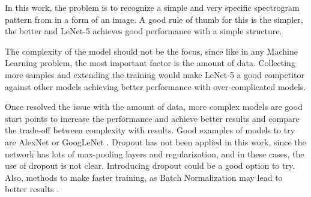 \documentclass[]{article}
\begin{document}
In this work, the problem is to recognize a simple and very specific spectrogram pattern from in a form of an image. A good rule of thumb for this is the simpler, the better and LeNet-5 achieves good performance with a simple structure.  

The complexity of the model should not be the focus, since like in any Machine Learning problem, the most important factor is the amount of data. Collecting more samples and extending the training would make LeNet-5 a good competitor against other models achieving better performance with over-complicated models.

Once resolved the issue with the amount of data, more complex models are good start points to increase the performance and achieve better results and compare the trade-off between complexity with results. Good examples of models to try are AlexNet \cite{Krizhevsky12} or GoogLeNet \cite{Szegedy16}. Dropout has not been applied in this work, since the network has lots of max-pooling layers and regularization, and in these cases, the use of dropout is not clear. Introducing dropout could be a good option to try. Also, methods to make faster training, as Batch Normalization may lead to better results \cite{szegedy15batch}.

%
\end{document}
